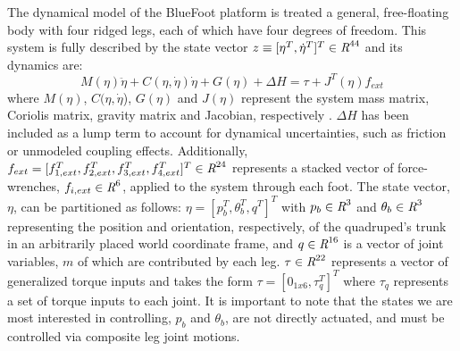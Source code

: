 			The dynamical model of the BlueFoot platform is treated a general, free-floating body with four ridged legs, each of which have four degrees of freedom. This system is fully described by the state vector $z \equiv [\eta^{T}, \dot{\eta}^{T}]^{T} \in \emph{R}^{44}$ and its dynamics are:
				\begin{equation}
					M(\eta)\ddot{\eta} + C(\eta,\dot{\eta})\dot{\eta} + G(\eta) + \Delta{H} = \tau + J^T(\eta) f_{ext} %
					\label{eq::normal_form_dynamics}
				\end{equation}
			where $M(\eta)$, $C(\eta,\dot{\eta}$), $G(\eta)$ and $J(\eta)$ represent the system mass matrix, Coriolis matrix, gravity matrix and Jacobian, respectively \cite{Wieber2006}. $\Delta{H}$ has been included as a lump term to account for dynamical uncertainties, such as friction or unmodeled coupling effects. Additionally, $f_{ext} = [ f_{1,ext}^{T},f_{2,ext}^{T},f_{3,ext}^{T},f_{4,ext}^{T}]^{T} \in \emph{R}^{24}$ represents a stacked vector of force-wrenches, $f_{i,ext} \in \emph{R}^{6}$, applied to the system through each \Ith foot. The state vector, $\eta$, can be partitioned as follows: $\eta = [ {p}_{b}^{T}, \theta_{b}^{T}, q^{T} ]^{T}$ with ${p}_{b} \in \emph{R}^{3}$ and $\theta_{b} \in \emph{R}^{3}$ representing the position and orientation, respectively, of the quadruped's trunk in an arbitrarily placed world coordinate frame, and $q \in \emph{R}^{16}$ is a vector of joint variables, $m$ of which are contributed by each leg. $\tau \in \emph{R}^{22}$ represents a vector of generalized torque inputs and takes the form $\tau = [ 0_{1x6}, \tau_{q}^{T} ]^{T}$ where $\tau_{q}$ represents a set of torque inputs to each joint. It is important to note that the states we are most interested in controlling, ${p}_{b}$ and $\theta_{b}$, are not directly actuated, and must be controlled via composite leg joint motions.		

